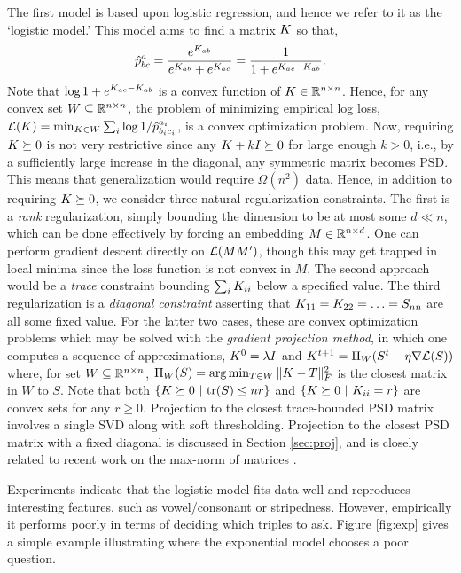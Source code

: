 \documentclass{article}
\begin{document}
The first model is based upon logistic regression, and hence we refer to it as the `logistic model.'  This model aims to find a matrix $\S$ so that,
\begin{equation}\label{eq:logistic}
\hat{p}^a_{bc} = \frac{e^{\S_{ab}}}{e^{\S_{ab}}+e^{\S_{ac}}} = \frac{1}{1+e^{\S_{ac}-\S_{ab}}}.
\end{equation}
Note that $\log 1+e^{\S_{ac}-\S_{ab}}$ is a convex function of $\S\in \reals^{n\times n}$.  Hence, for any convex set $W \subseteq \reals^{n \times n}$, the problem of minimizing empirical log loss, $\cL(\S)=\min_{\S \in W} \sum_i \log 1/\hp^{a_i}_{b_ic_i}$, is a convex optimization problem.  Now, requiring $\S \succeq 0$ is not very restrictive since any $\S+kI \succeq 0$ for large enough $k>0$, i.e., by a sufficiently large increase in the diagonal, any symmetric matrix becomes PSD. This means that generalization would require $\Omega(n^2)$ data.  Hence, in addition to requiring $\S \succeq 0$, we consider three natural regularization constraints.  The first is a {\em rank} regularization, simply bounding the dimension to be at most some $d\ll n$, which can be done effectively by forcing an embedding $M \in \reals^{n \times d}$.  One can perform gradient descent directly on $\cL(MM')$, though this may get trapped in local minima since the loss function is not convex in $M$.  The second approach would be a {\em trace} constraint bounding $\sum_i \S_{ii}$ below a specified value. The third regularization is a {\em diagonal constraint} asserting that $\S_{11}=\S_{22}=\ldots=S_{nn}$ are all some fixed value.  For the latter two cases, these are convex optimization problems which may be solved with the {\em gradient projection method}, in which one computes a sequence of approximations, $\S^0=\lambda I$ and $\S^{t+1}= \Pi_W(S^t - \eta \nabla \cL(S))$ where, for set $W \subseteq \reals^{n \times n}$, $\Pi_W(S)=\arg\min_{T \in W} \|\S-T\|_F^2$ is the closest matrix in $W$ to $S$.  Note that both $\{\S \succeq 0~|~\tr(S)\leq nr\}$ and $\{\S \succeq 0~|~\S_{ii}=r\}$ are convex sets for any $r\geq 0$.  Projection to the closest trace-bounded PSD matrix involves a single SVD along with soft thresholding.  Projection to the closest PSD matrix with a fixed diagonal is discussed in Section \ref{sec:proj}, and is closely related to recent work on the max-norm of matrices \cite{SS05,??}.

Experiments indicate that the logistic model fits data well and reproduces interesting features, such as vowel/consonant or stripedness.  However, empirically it performs poorly in terms of deciding which triples to ask.  Figure \ref{fig:exp} gives a simple example illustrating where the exponential model chooses a poor question.
\end{document}
